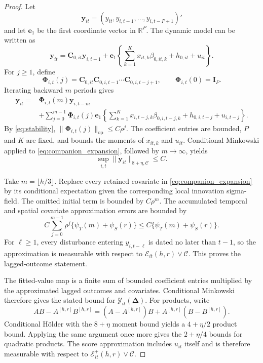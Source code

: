 \documentclass[11pt]{article}
\numberwithin{equation}{section}
\theoremstyle{remark}
\newcommand{\R}{\mathbb R}
\newcommand{\op}{\operatorname{op}}
\newcommand{\be}{\bm e}
\newcommand{\bC}{\bm C}
\newcommand{\bDelta}{\bm\Delta}
\newcommand{\bPhi}{\bm\Phi}
\begin{document}
\begin{proof}
Let
$$
\bm y_{it}
=
(y_{it},y_{i,t-1},\ldots,y_{i,t-P+1})'
$$
and let $\be_1$ be the first coordinate vector in $\R^P$. The dynamic model can be written as
$$
\bm y_{it}
=
\bC_{0,it}\bm y_{i,t-1}
+
\be_1
\left\{
\sum_{k=1}^{K}x_{it,k}\beta_{0,it,k}
+h_{0,it}
+u_{it}
\right\}.
$$
For $j\ge1$, define
$$
\bPhi_{i,t}(j)
=
\bC_{0,it}\bC_{0,i,t-1}\cdots\bC_{0,i,t-j+1},
\qquad
\bPhi_{i,t}(0)=\bm I_P.
$$
Iterating backward $m$ periods gives
\begin{align}
\bm y_{it}
={}&
\bPhi_{i,t}(m)\bm y_{i,t-m}
\nonumber\\
&+
\sum_{j=0}^{m-1}
\bPhi_{i,t}(j)\be_1
\left\{
\sum_{k=1}^{K}x_{i,t-j,k}\beta_{0,i,t-j,k}
+h_{0,i,t-j}
+u_{i,t-j}
\right\}.
\label{eq:companion_expansion}
\end{align}
By \eqref{eq:stability}, $\|\bPhi_{i,t}(j)\|_{\op}\le C\rho^j$. The coefficient entries are bounded, $P$ and $K$ are fixed, and  bounds the moments of $x_{it,k}$ and $u_{it}$. Conditional Minkowski applied to \eqref{eq:companion_expansion}, followed by $m\to\infty$, yields
$$
\sup_{i,t}\|\bm y_{it}\|_{8+\eta,\mathscr C}\le C.
$$

Take $m=\lfloor h/3\rfloor$. Replace every retained covariate in \eqref{eq:companion_expansion} by its conditional expectation given the corresponding local innovation sigma-field. The omitted initial term is bounded by $C\rho^m$. The accumulated temporal and spatial covariate approximation errors are bounded by
$$
C\sum_{j=0}^{m-1}\rho^j
\{\psi_T(m)+\psi_S(r)\}
\le
C\{\psi_T(m)+\psi_S(r)\}.
$$
For $\ell\ge1$, every disturbance entering $y_{i,t-\ell}$ is dated no later than $t-1$, so the approximation is measurable with respect to $\mathscr E_{it}(h,r)\vee\mathscr C$. This proves the lagged-outcome statement.

The fitted-value map is a finite sum of bounded coefficient entries multiplied by the approximated lagged outcomes and covariates. Conditional Minkowski therefore gives the stated bound for $\mathcal Y_{it}(\bDelta)$. For products, write
$$
AB-A^{[h,r]}B^{[h,r]}
=
(A-A^{[h,r]})B
+
A^{[h,r]}(B-B^{[h,r]}).
$$
Conditional H\"older with the $8+\eta$ moment bound yields a $4+\eta/2$ product bound. Applying the same argument once more gives the $2+\eta/4$ bounds for quadratic products. The score approximation includes $u_{it}$ itself and is therefore measurable with respect to $\mathscr E_{it}^{+}(h,r)\vee\mathscr C$.
\end{proof}
\end{document}
